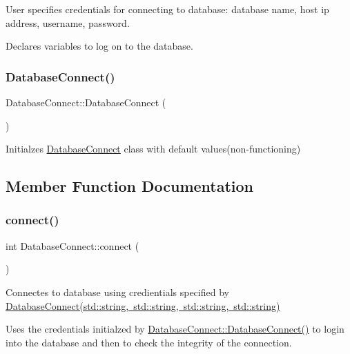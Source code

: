 User specifies credentials for connecting to database\+: database name, host ip address, username, password. 

Declares variables to log on to the database. \mbox{\label{classDatabaseConnect_a5f6ea02e82b1b8463d8c8053ef811e1f}} 
\subsubsection{\texorpdfstring{Database\+Connect()}{DatabaseConnect()}\hspace{0.1cm}{\footnotesize\ttfamily [2/2]}}
{\footnotesize\ttfamily Database\+Connect\+::\+Database\+Connect (\begin{DoxyParamCaption}{ }\end{DoxyParamCaption})}



Initialzes \mbox{\hyperlink{classDatabaseConnect}{Database\+Connect}} class with default values(non-\/functioning) 



\subsection{Member Function Documentation}
\mbox{\label{classDatabaseConnect_a9e0c28f4d98a60273eecaac77a596878}} 
\subsubsection{\texorpdfstring{connect()}{connect()}}
{\footnotesize\ttfamily int Database\+Connect\+::connect (\begin{DoxyParamCaption}{ }\end{DoxyParamCaption})}



Connectes to database using credientials specified by \mbox{\hyperlink{classDatabaseConnect_ad4273735005641691826765240a1dfb8}{Database\+Connect(std\+::string, std\+::string, std\+::string, std\+::string)}} 

Uses the credentials initialzed by \mbox{\hyperlink{classDatabaseConnect_a5f6ea02e82b1b8463d8c8053ef811e1f}{Database\+Connect\+::\+Database\+Connect()}} to login into the database and then to check the integrity of the connection. \mbox{\label{classDatabaseConnect_a252260a2134ff437ce2b84480a5632a0}} 
